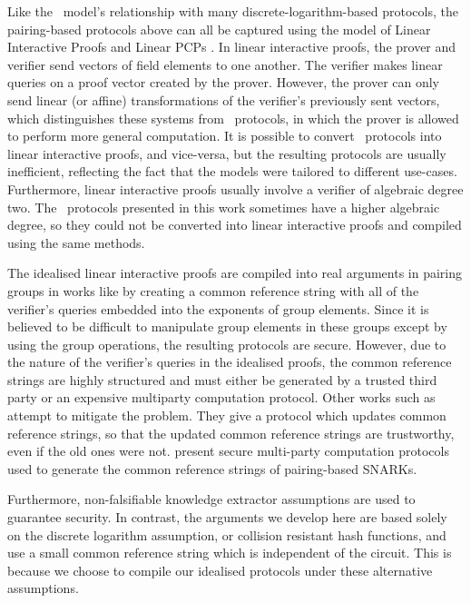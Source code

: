 Like the \ILC\ model's relationship with many discrete-logarithm-based protocols, the pairing-based protocols above can all be captured using the model of Linear Interactive Proofs and Linear PCPs \cite{BitanskyCIPO13}. In linear interactive proofs, the prover and verifier send vectors of field elements to one another. The verifier makes linear queries on a proof vector created by the prover. However, the prover can only send linear (or affine) transformations of the verifier's previously sent vectors, which distinguishes these systems from \ILC\ protocols, in which the prover is allowed to perform more general computation. It is possible to convert \ILC\ protocols into linear interactive proofs, and vice-versa, but the resulting protocols are usually inefficient, reflecting the fact that the models were tailored to different use-cases. Furthermore, linear interactive proofs usually involve a verifier of algebraic degree two. The \ILC\ protocols presented in this work sometimes have a higher algebraic degree, so they could not be converted into linear interactive proofs and compiled using the same methods.

The idealised linear interactive proofs are compiled into real arguments in pairing groups in works like \cite{BCTV14} by creating a common reference string with all of the verifier's queries embedded into the exponents of group elements. Since it is believed to be difficult to manipulate group elements in these groups except by using the group operations, the resulting protocols are secure. However, due to the nature of the verifier's queries in the idealised proofs, the common reference strings are highly structured and must either be generated by a trusted third party or an expensive multiparty computation protocol. Other works such as \cite{GrothKMMM18} attempt to mitigate the problem. They give a protocol which updates common reference strings, so that the updated common reference strings are trustworthy, even if the old ones were not. \cite{Ben-SassonC0TV15,BoweGG17} present secure multi-party computation protocols used to generate the common reference strings of pairing-based SNARKs.

Furthermore, non-falsifiable knowledge extractor assumptions are used to guarantee security.  In contrast, the arguments we develop here are based solely on the discrete logarithm assumption, or collision resistant hash functions, and use a small common reference string which is independent of the circuit. This is because we choose to compile our idealised protocols under these alternative assumptions.

